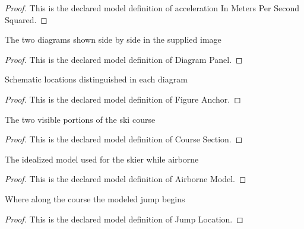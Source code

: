 \begin{proof}
  This is the declared model definition of acceleration In Meters Per Second Squared.
\end{proof}
\begin{definition}
  \label{def:physics:phyx-mini-0746:phyxminiproblems-problemphyxmini0746-diagrampanel}
  The two diagrams shown side by side in the supplied image
\end{definition}
\begin{proof}
  This is the declared model definition of Diagram Panel.
\end{proof}
\begin{definition}
  \label{def:physics:phyx-mini-0746:phyxminiproblems-problemphyxmini0746-figureanchor}
  Schematic locations distinguished in each diagram
\end{definition}
\begin{proof}
  This is the declared model definition of Figure Anchor.
\end{proof}
\begin{definition}
  \label{def:physics:phyx-mini-0746:phyxminiproblems-problemphyxmini0746-coursesection}
  The two visible portions of the ski course
\end{definition}
\begin{proof}
  This is the declared model definition of Course Section.
\end{proof}
\begin{definition}
  \label{def:physics:phyx-mini-0746:phyxminiproblems-problemphyxmini0746-airbornemodel}
  The idealized model used for the skier while airborne
\end{definition}
\begin{proof}
  This is the declared model definition of Airborne Model.
\end{proof}
\begin{definition}
  \label{def:physics:phyx-mini-0746:phyxminiproblems-problemphyxmini0746-jumplocation}
  Where along the course the modeled jump begins
\end{definition}
\begin{proof}
  This is the declared model definition of Jump Location.
\end{proof}
